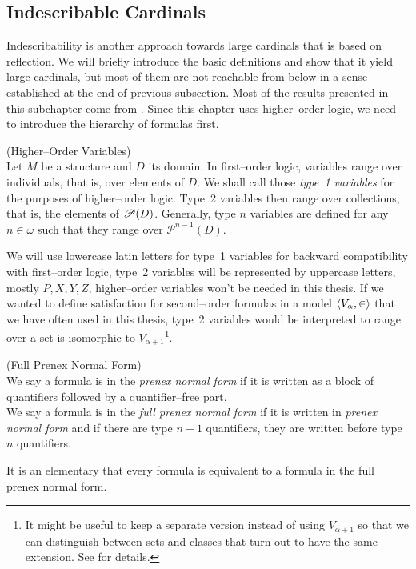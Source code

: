 \subsection{Indescribable Cardinals}

Indescribability is another approach towards large cardinals that is based on reflection. 
We will briefly introduce the basic definitions and show that it yield large cardinals, but most of them are not reachable from below in a sense established at the end of previous subsection.
Most of the results presented in this subchapter come from \cite{KanamoriBook}.
Since this chapter uses higher–order logic, we need to introduce the hierarchy of formulas first.

\begin{definition}{(Higher–Order Variables)}\label{def:higher_order_variables}\\
Let $M$ be a structure and $D$ its domain. In first–order logic, variables range over individuals, that is, over elements of $D$. We shall call those \emph{type~1 variables} for the purposes of higher–order logic. Type~2 variables then range over collections, that is, the elements of $\mathscr{P} (D)$. Generally, type $n$ variables are defined for any $n \in \omega$ such that they range over $\mathscr{P}^{n-1}(D)$.
\end{definition}
We will use lowercase latin letters for type~1 variables for backward compatibility with first–order logic, type~2 variables will be represented by uppercase letters, mostly $P, X, Y, Z$, higher–order variables won't be needed in this thesis. If we wanted to define satisfaction for second–order formulas in a model $\langle V_\alpha, \in \rangle$ that we have often used in this thesis, type~2 variables would be interpreted to range over a set is isomorphic to $V_{\alpha+1}$\footnote{It might be useful to keep a separate version instead of using $V_{\alpha+1}$ so that we can distinguish between sets and classes that turn out to have the same extension. See \cite{Koellner2009ORP} for details.}.

\begin{definition}{(Full Prenex Normal Form)}\label{def:pnf}\\
We say a formula is in the \emph{prenex normal form} if it is written as a block of quantifiers followed by a quantifier–free part.\\
We say a formula is in the \emph{full prenex normal form} if it is written in \emph{prenex normal form} and if there are type $n+1$ quantifiers, they are written before type $n$ quantifiers.
\end{definition}
It is an elementary that every formula is equivalent to a formula in the full prenex normal form.


